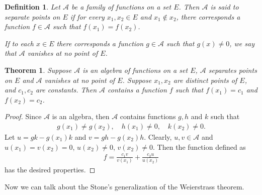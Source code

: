 \documentclass[11pt]{book}
\newtheorem{definition}{Definition}[chapter]
\newtheorem{theorem}{Theorem}[chapter]
\theoremstyle{definition}
\numberwithin{equation}{chapter}
\begin{document}
\medskip

\begin{definition}
Let $\mathscr{A}$ be a family of functions on a set $E$. Then $\mathscr{A}$ is said to separate points on $E$ if for every $x_1, x_2 \in E$ and $x_1 \notin x_2$, there corresponds a function $f \in \mathscr{A}$ such that $f(x_1) = f(x_2)$.

If to each $x \in E$ there corresponds a function $g \in \mathscr{A}$ such that $g(x) \neq 0$, we say that $\mathscr{A}$ vanishes at no point of $E$.
\end{definition}

\medskip

\begin{theorem}\label{th_622}
Suppose $\mathscr{A}$ is an algebra of functions on a set $E$, $\mathscr{A}$ separates points on $E$ and $\mathscr{A}$ vanishes at no point of $E$. Suppose $x_1, x_2$ are distinct points of $E$, and $c_1, c_2$ are constants. Then $\mathscr{A}$ contains a function $f$ such that $f(x_1) = c_1$ and $f(x_2) = c_2$.
\end{theorem}
\begin{proof}
Since $\mathscr{A}$ is an algebra, then $\mathscr{A}$ contains functions $g,h$ and $k$ such that
\begin{align*}
    g(x_1) \neq g(x_2), \quad h(x_1) \neq 0, \quad k(x_2) \neq 0.
\end{align*}
Let $u = gk - g(x_1)k$ and $v = gh - g(x_2)h$. Clearly, $u,v \in \mathscr{A}$ and $u(x_1) = v(x_2) = 0$, $u(x_2) \neq 0$, $v(x_2) \neq 0$. Then the function defined as
\begin{align*}
    f = \frac{c_1v}{v(x_1)} + \frac{c_2u}{u(x_2)}
\end{align*}
has the desired properties.
\end{proof}

\medskip

Now we can talk about the Stone's generalization of the Weierstrass theorem.

\medskip
\end{document}
